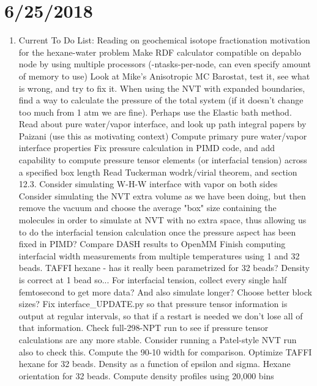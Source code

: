 \documentclass[12pt,reqno]{amsart}
\numberwithin{equation}{section}
\begin{document}
\section{6/25/2018}
\begin{enumerate}
\item Current To Do List:
\subitem Reading on geochemical isotope fractionation motivation for the hexane-water problem
\subitem Make RDF calculator compatible on depablo node by using multiple processors (-ntasks-per-node, can even specify amount of memory to use)
\subitem Look at Mike's Anisotropic MC Barostat, test it, see what is wrong, and try to fix it.  
\subitem When using the NVT with expanded boundaries, find a way to calculate the pressure of the total system (if it doesn't change too much from 1 atm we are fine).  Perhaps use the Elastic bath method.  
\subitem Read about pure water/vapor interface, and look up path integral papers by Paizani (use this as motivating context)
\subitem Compute primary pure water/vapor interface properties 
\subitem Fix pressure calculation in PIMD code, and add capability to compute pressure tensor elements (or interfacial tension) across a specified box length 
\subitem Read Tuckerman wodrk/virial theorem, and section 12.3.  
\subitem Consider simulating W-H-W interface with vapor on both sides
\subitem Consider simulating the NVT extra volume as we have been doing, but then remove the vacuum and choose the average "box" size containing the molecules in order to simulate at NVT with no extra space, thus allowing us to do the interfacial tension calculation once the pressure aspect has been fixed in PIMD? 
\subitem Compare DASH results to OpenMM
\subitem Finish computing interfacial width measurements from multiple temperatures using 1 and 32 beads. 
\subitem TAFFI hexane - has it really been parametrized for 32 beads?  Density is correct at 1 bead so... 
\subitem For interfacial tension, collect every single half femtosecond to get more data?  And also simulate longer?  Choose better block sizes?
\subitem Fix interface\_UPDATE.py so that pressure tensor information is output at regular intervals, so that if a restart is needed we don't lose all of that information.  
\subitem Check full-298-NPT run to see if pressure tensor calculations are any more stable.  Consider running a Patel-style NVT run also to check this.  
\subitem Compute the 90-10 width for comparison.  
\subitem Optimize TAFFI hexane for 32 beads.  Density as a function of epsilon and sigma. 
\subitem Hexane orientation for 32 beads.   
\subitem Compute density profiles using 20,000 bins

\end{enumerate}
\end{document}
